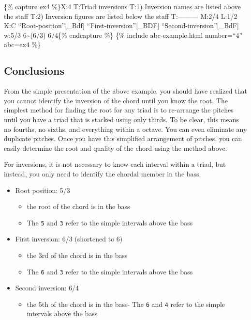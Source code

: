 \documentclass{book}
\providecommand{\tightlist}{%
  \setlength{\itemsep}{0pt}\setlength{\parskip}{0pt}}
\begin{document}
\{\% capture ex4 \%\}X:4 T:Triad inversions T:1) Inversion names are listed
above the staff T:2) Inversion figures are listed below the staff T:---------
M:2/4 L:1/2 K:C ``Root-position''{[}\_Bdf{]}\textbar{}
``First-inversion''{[}\_BDF{]}\textbar{}
``Second-inversion''{[}\_BdF{]}\textbar\textbar{} w:5/3 6\textasciitilde(6/3)
6/4\{\% endcapture \%\} \{\% include abc-example.html number=``4'' abc=ex4
\%\}

\hypertarget{conclusions-23}{%
\subsection{Conclusions}\label{conclusions-23}}

From the simple presentation of the above example, you should have realized
that you cannot identify the inversion of the chord until you know the root.
The simplest method for finding the root for any triad is to re-arrange the
pitches until you have a triad that is stacked using only thirds. To be clear,
this means no fourths, no sixths, and everything within a octave. You can even
eliminate any duplicate pitches. Once you have this simplified arrangement of
pitches, you can easily determine the root and quality of the chord using the
method above.

For inversions, it is not necessary to know each interval within a triad, but
instead, you only need to identify the chordal member in the bass.

\begin{itemize}
\tightlist
\item
  Root position: 5/3

  \begin{itemize}
  \tightlist
  \item
    the root of the chord is in the bass
  \item
    The \texttt{5} and \texttt{3} refer to the simple intervals above the bass
  \end{itemize}
\item
  First inversion: 6/3 (shortened to 6)

  \begin{itemize}
  \tightlist
  \item
    the 3rd of the chord is in the bass
  \item
    The \texttt{6} and \texttt{3} refer to the simple intervals above the bass
  \end{itemize}
\item
  Second inversion: 6/4

  \begin{itemize}
  \tightlist
  \item
    the 5th of the chord is in the bass- The \texttt{6} and \texttt{4} refer
    to the simple intervals above the bass
  \end{itemize}
\end{itemize}
\end{document}
